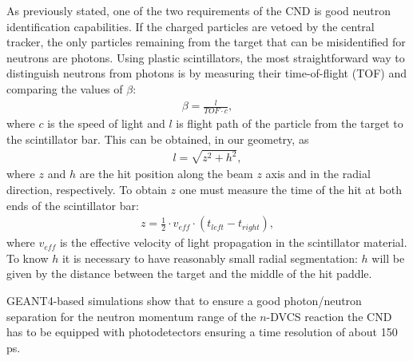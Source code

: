 As previously stated, one of the two requirements of the CND is good neutron identification capabilities. If the charged particles are vetoed by the central tracker, the only particles remaining from the target that can be misidentified for neutrons are photons. Using plastic scintillators, the most straightforward way to distinguish neutrons from photons is by measuring their time-of-flight (TOF) and comparing the values of $\beta$:
\begin{eqnarray}
\beta= \frac{l}{TOF\cdot c},
\end{eqnarray}
where $c$ is the speed of light and $l$ is flight path of the particle from the target to the scintillator bar. This can be obtained, in our geometry, as
\begin{eqnarray}
l= \sqrt{z^2+h^2},
\end{eqnarray}
where $z$ and $h$ are the hit position along the beam $z$ axis and in the radial direction, respectively. To obtain $z$ one must measure the time of the hit at both ends of the scintillator bar:
\begin{eqnarray}
z=\frac{1}{2} \cdot v_{eff}\cdot(t_{left}-t_{right}),
\end{eqnarray}
where $v_{eff}$ is the effective velocity of light propagation in the scintillator material. To know $h$ it is necessary to have reasonably small radial segmentation: $h$ will be given by the distance between the target and the middle of the hit paddle.
   
GEANT4-based simulations show that to ensure a good photon/neutron separation for the neutron momentum range of the $n$-DVCS reaction the CND has to be equipped with photodetectors ensuring a time resolution of about 150 ps. 


